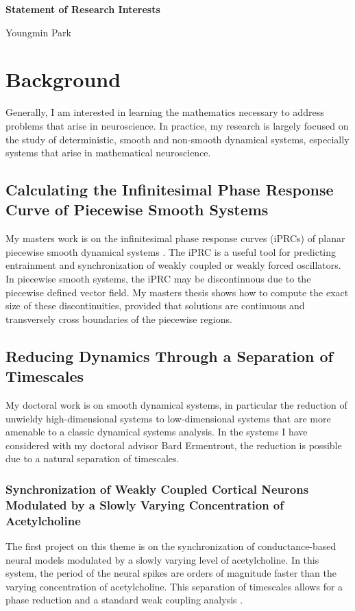 \documentclass[a4paper,11pt]{article}
\begin{document}
\begin{center}
\Large \textbf{Statement of Research Interests}

\Large Youngmin Park
\end{center}


\section{Background}
Generally, I am interested in learning the mathematics necessary to address problems that arise in neuroscience. In practice, my research is largely focused on the study of deterministic, smooth and non-smooth dynamical systems, especially systems that arise in mathematical neuroscience.

\subsection{Calculating the Infinitesimal Phase Response Curve of Piecewise Smooth Systems}
My masters work is on the infinitesimal phase response curves (iPRCs) of planar piecewise smooth dynamical systems \cite{park2013infinitesimal}. The iPRC is a useful tool for predicting entrainment and synchronization of weakly coupled or weakly forced oscillators. In piecewise smooth systems, the iPRC may be discontinuous due to the piecewise defined vector field. My masters thesis shows how to compute the exact size of these discontinuities, provided that solutions are continuous and transversely cross boundaries of the piecewise regions.

\subsection{Reducing Dynamics Through a Separation of Timescales}
My doctoral work is on smooth dynamical systems, in particular the reduction of unwieldy high-dimensional systems to low-dimensional systems that are more amenable to a classic dynamical systems analysis. In the systems I have considered with my doctoral advisor Bard Ermentrout, the reduction is possible due to a natural separation of timescales.

\subsubsection{Synchronization of Weakly Coupled Cortical Neurons Modulated by a Slowly Varying Concentration of Acetylcholine}
The first project on this theme is on the synchronization of conductance-based neural models modulated by a slowly varying level of acetylcholine. In this system, the period of the neural spikes are orders of magnitude faster than the varying concentration of acetylcholine. This separation of timescales allows for a phase reduction and a standard weak coupling analysis \cite{park2016weakly}.
\end{document}
